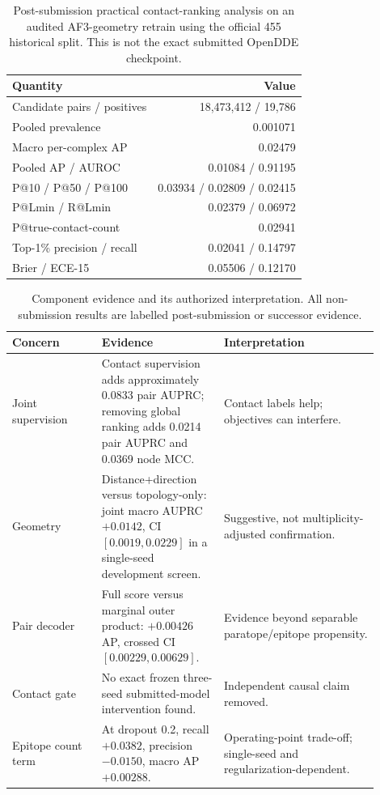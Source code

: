 
\begin{table}[t]
\centering
\small
\caption{Post-submission practical contact-ranking analysis on an audited AF3-geometry retrain using the official 455 historical split. This is not the exact submitted OpenDDE checkpoint.}
\begin{tabular}{lr}
\toprule
Quantity & Value \\
\midrule
Candidate pairs / positives & 18,473,412 / 19,786 \\
Pooled prevalence & 0.001071 \\
Macro per-complex AP & 0.02479 \\
Pooled AP / AUROC & 0.01084 / 0.91195 \\
P@10 / P@50 / P@100 & 0.03934 / 0.02809 / 0.02415 \\
P@Lmin / R@Lmin & 0.02379 / 0.06972 \\
P@true-contact-count & 0.02941 \\
Top-1\% precision / recall & 0.02041 / 0.14797 \\
Brier / ECE-15 & 0.05506 / 0.12170 \\
\bottomrule
\end{tabular}
\end{table}

\begin{table}[t]
\centering
\small
\caption{Component evidence and its authorized interpretation. All non-submission results are labelled post-submission or successor evidence.}
\begin{tabular}{p{0.22\linewidth}p{0.30\linewidth}p{0.38\linewidth}}
\toprule
Concern & Evidence & Interpretation \\
\midrule
Joint supervision & Contact supervision adds approximately 0.0833 pair AUPRC; removing global ranking adds 0.0214 pair AUPRC and 0.0369 node MCC. & Contact labels help; objectives can interfere. \\
Geometry & Distance+direction versus topology-only: joint macro AUPRC $+0.0142$, CI $[0.0019,0.0229]$ in a single-seed development screen. & Suggestive, not multiplicity-adjusted confirmation. \\
Pair decoder & Full score versus marginal outer product: $+0.00426$ AP, crossed CI $[0.00229,0.00629]$. & Evidence beyond separable paratope/epitope propensity. \\
Contact gate & No exact frozen three-seed submitted-model intervention found. & Independent causal claim removed. \\
Epitope count term & At dropout 0.2, recall $+0.0382$, precision $-0.0150$, macro AP $+0.00288$. & Operating-point trade-off; single-seed and regularization-dependent. \\
\bottomrule
\end{tabular}
\end{table}
